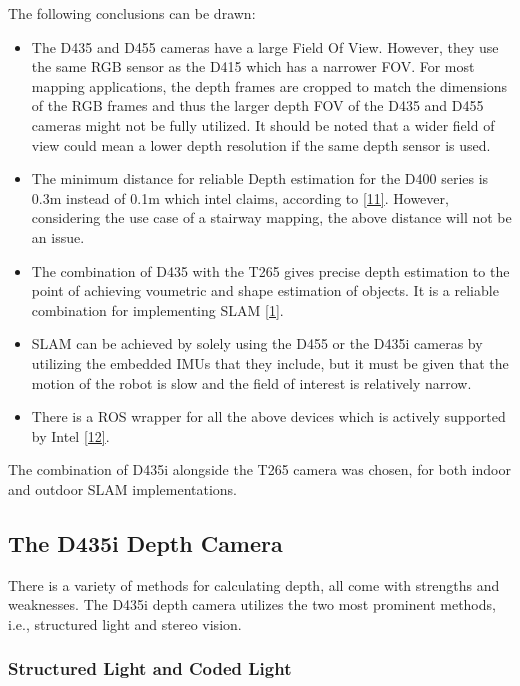 \documentclass{article}
\begin{document}
The following conclusions can be drawn:
\begin{itemize}
  \item The D435 and D455 cameras have a large Field Of View. However, they use the same RGB sensor as the D415 which has a narrower FOV. For most mapping applications, the depth frames are cropped to match the dimensions of the RGB frames and thus the larger depth FOV of the D435 and D455 cameras might not be fully utilized. It should be noted that a wider field of view could mean a lower depth resolution if the same depth sensor is used.
  \item The minimum distance for reliable Depth estimation for the D400 series is 0.3m instead of 0.1m which intel claims, according to \href{https://www.youtube.com/watch?v=mFLZkdH1yLE}{[11]}. However, considering the use case of a stairway mapping, the above distance will not be an issue.
  \item The combination of D435 with the T265 gives precise depth estimation to the point of achieving voumetric and shape estimation of objects. It is a reliable combination for implementing SLAM \href{https://www.intelrealsense.com/tracking-camera-t265/}{[1]}.
  \item SLAM can be achieved by solely using the D455 or the D435i cameras by utilizing the embedded IMUs that they include, but it must be given that the motion of the robot is slow and the field of interest is relatively narrow.
  \item There is a ROS wrapper for all the above devices which is actively supported by Intel  \href{https://github.com/IntelRealSense/realsense-ros}{[12]}.
\end{itemize}

The combination of D435i alongside the T265 camera was chosen, for both indoor and outdoor SLAM implementations.

\subsection{The D435i Depth Camera}

There is a variety of methods for calculating depth, all come with strengths and weaknesses. The D435i depth camera utilizes the two most prominent methods, i.e., structured light and stereo vision.

\subsubsection{Structured Light and Coded Light}                    
\end{document}
